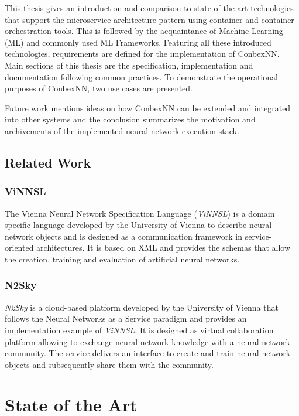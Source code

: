 This thesis gives an introduction and comparison to state of the art
technologies that support the microservice architecture pattern using
container and container orchestration tools. This is followed by the
acquaintance of Machine Learning (ML) and commonly used ML Frameworks.
Featuring all these introduced technologies, requirements are defined
for the implementation of ConbexNN. Main sections of this thesis are the
specification, implementation and documentation following common
practices. To demonstrate the operational purposes of ConbexNN, two use
cases are presented.

Future work mentions ideas on how ConbexNN can be extended and
integrated into other systems and the conclusion summarizes the
motivation and archivements of the implemented neural network execution
stack.

\section{Related Work}\label{related-work}

\subsection{ViNNSL}\label{vinnsl}

The Vienna Neural Network Specification Language (\emph{ViNNSL}) is a
domain specific language developed by the University of Vienna to
describe neural network objects and is designed as a communication
framework in service-oriented architectures. It is based on XML and
provides the schemas that allow the creation, training and evaluation of
artificial neural networks. \cite{beran_2008}

\subsection{N2Sky}\label{n2sky}

\emph{N2Sky} is a cloud-based platform developed by the University of
Vienna that follows the Neural Networks as a Service paradigm and
provides an implementation example of \emph{ViNNSL}. It is designed as
virtual collaboration platform allowing to exchange neural network
knowledge with a neural network community. The service delivers an
interface to create and train neural network objects and subsequently
share them with the community. \cite{schikuta_2013}\cite{n2sky-2}

\chapter{State of the Art}\label{state-of-the-art}


